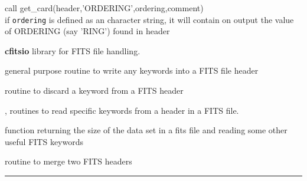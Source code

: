 \begin{example}
{
call get\_card(header,'ORDERING',ordering,comment)  \\
}
{
if {\tt ordering} is defined as an character string, it
will contain on output the value of ORDERING (say 'RING') found in header
}
\end{example}

\begin{modules}
  \begin{sulist}{} %
  \item[\textbf{cfitsio}] library for FITS file handling.		
  \end{sulist}
\end{modules}

\begin{related}
  \begin{sulist}{} %
  \item[\htmlref{add\_card}{sub:add_card}] general purpose routine to write any keywords into a FITS
  file header
  \item[\htmlref{del\_card}{sub:del_card}] routine to discard a keyword from a FITS header
  \item[\htmlref{read\_par}{sub:read_par}, \htmlref{number\_of\_alms}{sub:number_of_alms}] routines to read specific keywords from a
  header in a FITS file.
  \item[\htmlref{getsize\_fits}{sub:getsize_fits}] function returning the size of the data set in a fits
  file and reading some other useful FITS keywords
  \item[\htmlref{merge\_headers}{sub:merge_headers}] routine to merge two FITS headers
  \end{sulist}
\end{related}

\rule{\hsize}{2mm}

\newpage
